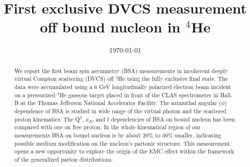 \documentclass[twocolumn,nofootinbib,showpacs,prl,superscriptaddress,secnumarabic,amssymb,nobibnotes,aps,floatfix]{revtex4}
\begin{document}
\linenumbers

\title{First exclusive DVCS measurement off bound nucleon in $^4$He}



%
\date{\today}
\begin{abstract}

 We report the first beam spin asymmetry (BSA) measurements in incoherent 
 deeply virtual Compton scattering (DVCS) off $^4$He using the fully exclusive 
 final state. The data were accumulated using a 6 GeV longitudinally polarized 
 electron beam incident on a pressurized $^4$He gaseous target placed in front 
 of the CLAS spectrometer in Hall-B at the Thomas Jefferson National 
 Accelerator Facility. The azimuthal angular ($\phi$) dependence of BSA is 
 studied in wide range of the virtual photon and the scattered proton 
 kinematics. The Q$^2$, $x_B$, and $t$ dependencies of BSA on bound nucleon has 
 been compared with one on free proton. In the whole kinematical region of our 
 measurements BSA on bound nucleon is by about $20\%$ to $30\%$ smaller, 
 indicating possible medium modification on the nucleon's partonic structure.  
 This measurement opens a new opportunity to explore the origin of the EMC 
 effect within the framework of the generalized parton distributions.

\end{abstract}

\maketitle 
\end{document}
